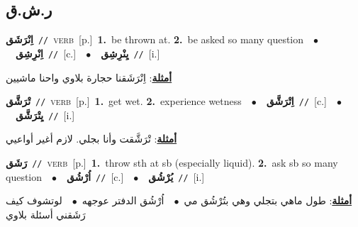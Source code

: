 \documentclass[10pt,a4paper,twoside]{article} %
\begin{document}
\begin{multicols}{2}
\vspace{-3mm}
\subsection*{\color{blue}\foreignlanguage{arabic}{ر.ش.ق}\color{blue}{}} 

{\setlength\topsep{0pt}\textbf{\foreignlanguage{arabic}{اِنْرَشَق}}\ {\color{gray}\texttt{//}\color{black}}\ \textsc{verb}\ [p.]\ \textbf{1.}~be thrown at.  \textbf{2.}~be asked so many question\ \ $\bullet$\ \ \setlength\topsep{0pt}\textbf{\foreignlanguage{arabic}{اِنْرِشِق}}\ {\color{gray}\texttt{//}\color{black}}\ [c.]\ \ $\bullet$\ \ \setlength\topsep{0pt}\textbf{\foreignlanguage{arabic}{يِنْرِشِق}}\ {\color{gray}\texttt{//}\color{black}}\ [i.]\  \begin{flushright}\color{gray}\foreignlanguage{arabic}{\textbf{\underline{\foreignlanguage{arabic}{أمثلة}}}: اِنْرَشَقنا حجارة بلاوي واحنا ماشيين}\end{flushright}\color{black}} \vspace{2mm}

{\setlength\topsep{0pt}\textbf{\foreignlanguage{arabic}{تْرَشَّق}}\ {\color{gray}\texttt{//}\color{black}}\ \textsc{verb}\ [p.]\ \textbf{1.}~get wet.  \textbf{2.}~experience wetness\ \ $\bullet$\ \ \setlength\topsep{0pt}\textbf{\foreignlanguage{arabic}{اِتْرَشَّق}}\ {\color{gray}\texttt{//}\color{black}}\ [c.]\ \ $\bullet$\ \ \setlength\topsep{0pt}\textbf{\foreignlanguage{arabic}{يِتْرَشَّق}}\ {\color{gray}\texttt{//}\color{black}}\ [i.]\  \begin{flushright}\color{gray}\foreignlanguage{arabic}{\textbf{\underline{\foreignlanguage{arabic}{أمثلة}}}: تْرَشَّقت وأنا بجلي. لازم أغير أواعيي}\end{flushright}\color{black}} \vspace{2mm}

{\setlength\topsep{0pt}\textbf{\foreignlanguage{arabic}{رَشَق}}\ {\color{gray}\texttt{//}\color{black}}\ \textsc{verb}\ [p.]\ \textbf{1.}~throw sth at sb (especially liquid).  \textbf{2.}~ask sb so many question\ \ $\bullet$\ \ \setlength\topsep{0pt}\textbf{\foreignlanguage{arabic}{اُرْشُق}}\ {\color{gray}\texttt{//}\color{black}}\ [c.]\ \ $\bullet$\ \ \setlength\topsep{0pt}\textbf{\foreignlanguage{arabic}{يُرْشُق}}\ {\color{gray}\texttt{//}\color{black}}\ [i.]\  \begin{flushright}\color{gray}\foreignlanguage{arabic}{\textbf{\underline{\foreignlanguage{arabic}{أمثلة}}}: طول ماهي بتجلي وهي بتُرْشُق مي\ $\bullet$\ \  اُرْشُق الدفتر عوجهه\ $\bullet$\ \  لوتشوف كيف رَشَقني أسئلة بلاوي}\end{flushright}\color{black}} \vspace{2mm}


\end{multicols}
\end{document}

